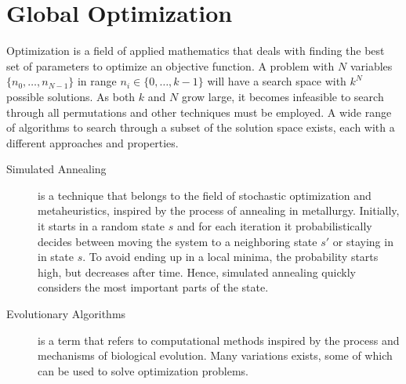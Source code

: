 \section{Global Optimization}

Optimization is a field of applied mathematics that deals with finding the
best set of parameters to optimize an objective function. A problem with
$N$ variables $\{n_0, \dots, n_{N-1}\}$ in range $n_i \in \{0, \dots, k-1\}$ will have a
search space with $k^N$ possible solutions. As both $k$ and $N$ grow large, it
becomes infeasible to search through all permutations and other techniques must
be employed. A wide range of algorithms to search through a subset of the
solution space exists, each with a different approaches and properties.

\begin{description}
    \item[Simulated Annealing] is a technique that belongs to the field of
        stochastic optimization and metaheuristics, inspired by the process of
        annealing in metallurgy. Initially, it starts in a random state $s$ and
        for each iteration it probabilistically decides between moving the
        system to a neighboring state $s'$ or staying in in state $s$. To avoid
        ending up in a local minima, the probability starts high, but decreases
        after time. Hence, simulated annealing quickly considers the most
        important parts of the state.
    \item[Evolutionary Algorithms] is a term that refers to computational
        methods inspired by the process and mechanisms of biological evolution.
        Many variations exists, some of which can be used to solve optimization
        problems.

\end{description}

